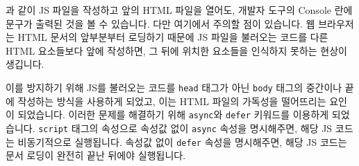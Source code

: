과 같이 JS 파일을 작성하고 앞의 HTML 파일을 열어도, 개발자 도구의 Console 란에 문구가 출력된 것을 볼 수 있습니다. 다만 여기에서 주의할 점이 있습니다. 웹 브라우저는 HTML 문서의 앞부분부터 로딩하기 때문에 JS 파일을 불러오는 코드를 다른 HTML 요소들보다 앞에 작성하면, 그 뒤에 위치한 요소들을 인식하지 못하는 현상이 생깁니다. 

이를 방지하기 위해 JS를 불러오는 코드를 \texttt{head} 태그가 아닌 \texttt{body} 태그의 중간이나 끝에 작성하는 방식을 사용하게 되었고, 이는 HTML 파일의 가독성을 떨어뜨리는 요인이 되었습니다. 이러한 문제를 해결하기 위해 \texttt{async}와 \texttt{defer} 키워드를 이용하게 되었습니다. \texttt{script} 태그의 속성으로 속성값 없이 \texttt{async} 속성을 명시해주면, 해당 JS 코드는 비동기적으로 실행됩니다. 속성값 없이 \texttt{defer} 속성을 명시해주면, 해당 JS 코드는 문서 로딩이 완전히 끝난 뒤에야 실행됩니다. 
